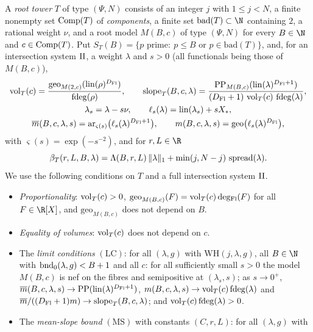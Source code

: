 \begin{definition}\label{def:pf:deepstr:roottower}
A \emph{root tower} $T$ of type $(\Psi,N)$ consists of an integer $j$ with $1\le j<N$, a finite nonempty
set $\operatorname{Comp}(T)$ of \emph{components}, a finite set $\mathrm{bad}(T)\subset\N$ containing $2$, a
rational weight $\nu$, and a root model $M(B,c)$ of type $(\Psi,N)$ for every $B\in\N$ and
$c\in\operatorname{Comp}(T)$. Put $S_T(B)=\{p\text{ prime}:\ p\le B\text{ or }p\in\mathrm{bad}(T)\}$, and, for an
intersection system $\mathrm{II}$, a weight $\lambda$ and $s>0$ (all functionals being those of $M(B,c)$),
\begin{gather*}
\operatorname{vol}_T(c)=\frac{\mathrm{geo}_{M(2,c)}(\operatorname{lin}(\rho)^{D_{\mathrm{Fl}}})}{\operatorname{fdeg}(\rho)},\qquad
\operatorname{slope}_T(B,c,\lambda)=\frac{\mathrm{PP}_{M(B,c)}(\operatorname{lin}(\lambda)^{D_{\mathrm{Fl}}+1})}
{(D_{\mathrm{Fl}}+1)\,\operatorname{vol}_T(c)\,\operatorname{fdeg}(\lambda)},\\
\lambda_s=\lambda-s\nu,\qquad \ell_s(\lambda)=\operatorname{lin}(\lambda_s)+sX_\ast,\\
\overline m(B,c,\lambda,s)=\mathrm{ar}_{\varsigma(s)}\bigl(\ell_s(\lambda)^{D_{\mathrm{Fl}}+1}\bigr),\qquad
m(B,c,\lambda,s)=\mathrm{geo}\bigl(\ell_s(\lambda)^{D_{\mathrm{Fl}}}\bigr),
\end{gather*}
with $\varsigma(s)=\exp(-s^{-2})$, and for $r,L\in\R$
\[
\beta_T(r,L,B,\lambda)=\Lambda(B,r,L)\,\|\lambda\|_1+\min(j,N-j)\,\operatorname{spread}(\lambda).
\]
We use the following conditions on $T$ and a full intersection system $\mathrm{II}$.
\begin{itemize}
\item \emph{Proportionality}: $\operatorname{vol}_T(c)>0$, $\mathrm{geo}_{M(B,c)}(F)=\operatorname{vol}_T(c)\operatorname{deg_{Fl}}(F)$ for
all $F\in\R[X]$, and $\mathrm{geo}_{M(B,c)}$ does not depend on $B$.
\item \emph{Equality of volumes}: $\operatorname{vol}_T(c)$ does not depend on $c$.
\item The \emph{limit conditions} $\mathrm{(LC)}$: for all $(\lambda,g)$ with $\mathrm{WH}(j,\lambda,g)$, all
$B\in\N$ with $\operatorname{bnd}_0(\lambda,g)<B+1$ and all $c$: for all sufficiently small $s>0$ the model $M(B,c)$
is nef on the fibres and semipositive at $(\lambda_s,s)$; as $s\to0^+$,
$\overline m(B,c,\lambda,s)\to\mathrm{PP}(\operatorname{lin}(\lambda)^{D_{\mathrm{Fl}}+1})$,
$m(B,c,\lambda,s)\to\operatorname{vol}_T(c)\operatorname{fdeg}(\lambda)$ and
$\overline m/((D_{\mathrm{Fl}}+1)m)\to\operatorname{slope}_T(B,c,\lambda)$; and
$\operatorname{vol}_T(c)\operatorname{fdeg}(\lambda)>0$.
\item The \emph{mean-slope bound} $\mathrm{(MS)}$ with constants $(C,r,L)$: for all $(\lambda,g)$ with

\end{itemize}
\end{definition}
